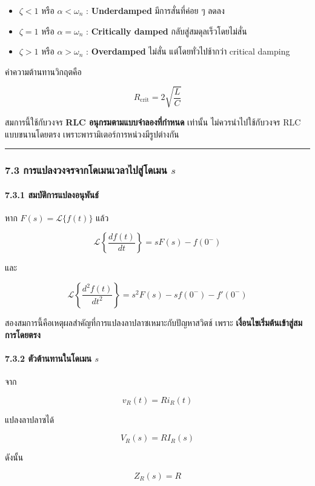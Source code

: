 \begin{itemize}
    \item $\zeta<1$ หรือ $\alpha<\omega_n$ : \textbf{Underdamped} มีการสั่นที่ค่อย ๆ ลดลง
    \item $\zeta=1$ หรือ $\alpha=\omega_n$ : \textbf{Critically damped} กลับสู่สมดุลเร็วโดยไม่สั่น
    \item $\zeta>1$ หรือ $\alpha>\omega_n$ : \textbf{Overdamped} ไม่สั่น แต่โดยทั่วไปช้ากว่า critical damping
\end{itemize}

ค่าความต้านทานวิกฤตคือ

\[
R_{\text{crit}}=2\sqrt{\frac{L}{C}}
\]

สมการนี้ใช้กับวงจร \textbf{RLC อนุกรมตามแบบจำลองที่กำหนด} เท่านั้น ไม่ควรนำไปใช้กับวงจร RLC แบบขนานโดยตรง เพราะพารามิเตอร์การหน่วงมีรูปต่างกัน

\par\noindent\rule{\textwidth}{0.4pt}\par

\subsubsection{7.3 การแปลงวงจรจากโดเมนเวลาไปสู่โดเมน \texorpdfstring{$s$}{s}}

\paragraph{7.3.1 สมบัติการแปลงอนุพันธ์}

หาก $F(s)=\mathcal{L}\{f(t)\}$ แล้ว

\[
\mathcal{L}\left\{\frac{df(t)}{dt}\right\}=sF(s)-f(0^-)
\]

และ

\[
\mathcal{L}\left\{\frac{d^2f(t)}{dt^2}\right\}=s^2F(s)-sf(0^-)-f'(0^-)
\]

สองสมการนี้คือเหตุผลสำคัญที่การแปลงลาปลาซเหมาะกับปัญหาสวิตช์ เพราะ \textbf{เงื่อนไขเริ่มต้นเข้าสู่สมการโดยตรง}

\paragraph{7.3.2 ตัวต้านทานในโดเมน $s$}

จาก

\[
v_R(t)=Ri_R(t)
\]

แปลงลาปลาซได้

\[
V_R(s)=RI_R(s)
\]

ดังนั้น

\[
Z_R(s)=R
\]

